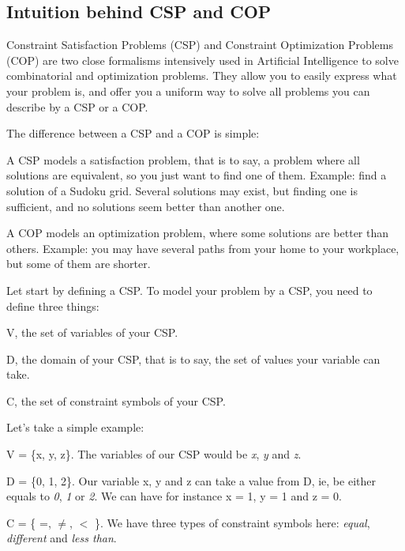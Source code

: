 \subsection*{Intuition behind C\-S\-P and C\-O\-P }

Constraint Satisfaction Problems (C\-S\-P) and Constraint Optimization Problems (C\-O\-P) are two close formalisms intensively used in Artificial Intelligence to solve combinatorial and optimization problems. They allow you to easily express what your problem is, and offer you a uniform way to solve all problems you can describe by a C\-S\-P or a C\-O\-P.

The difference between a C\-S\-P and a C\-O\-P is simple\-:


\begin{DoxyItemize}
\item A C\-S\-P models a satisfaction problem, that is to say, a problem where all solutions are equivalent, so you just want to find one of them. Example\-: find a solution of a Sudoku grid. Several solutions may exist, but finding one is sufficient, and no solutions seem better than another one.
\item A C\-O\-P models an optimization problem, where some solutions are better than others. Example\-: you may have several paths from your home to your workplace, but some of them are shorter.
\end{DoxyItemize}

Let start by defining a C\-S\-P. To model your problem by a C\-S\-P, you need to define three things\-:


\begin{DoxyItemize}
\item V, the set of variables of your C\-S\-P.
\item D, the domain of your C\-S\-P, that is to say, the set of values your variable can take.
\item C, the set of constraint symbols of your C\-S\-P.
\end{DoxyItemize}

Let's take a simple example\-:


\begin{DoxyItemize}
\item V = \{x, y, z\}. The variables of our C\-S\-P would be {\itshape x}, {\itshape y} and {\itshape z}.
\item D = \{0, 1, 2\}. Our variable x, y and z can take a value from D, ie, be either equals to {\itshape 0}, {\itshape 1} or {\itshape 2}. We can have for instance x = 1, y = 1 and z = 0.
\item C = \{ =, {$\ne$}, $<$ \}. We have three types of constraint symbols here\-: {\itshape equal}, {\itshape different} and {\itshape less than}.
\end{DoxyItemize}

